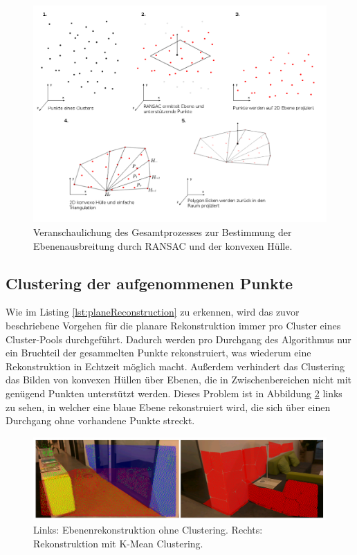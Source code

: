 \begin{figure}[h]
  \centering
	\includegraphics[width=1.1\textwidth]{content/images/methods/polygon-process.png} 
  \caption{Veranschaulichung des Gesamtprozesses zur Bestimmung der Ebenenausbreitung durch RANSAC und der konvexen Hülle.}
  \label{fig:polygon-process}
\end{figure}

\newpage

\subsection{Clustering der aufgenommenen Punkte} \label{sec:cluster}

Wie im Listing \ref{lst:planeReconstruction} zu erkennen, wird das zuvor beschriebene Vorgehen für die planare Rekonstruktion immer pro Cluster eines Cluster-Pools durchgeführt. Dadurch werden pro Durchgang des Algorithmus nur ein Bruchteil der gesammelten Punkte rekonstruiert, was wiederum eine Rekonstruktion in Echtzeit möglich macht. Außerdem verhindert das Clustering das Bilden von konvexen Hüllen über Ebenen, die in Zwischenbereichen nicht mit genügend Punkten unterstützt werden. Dieses Problem ist in Abbildung \ref{fig:clustering} links zu sehen, in welcher eine blaue Ebene rekonstruiert wird, die sich über einen Durchgang ohne vorhandene Punkte streckt.

\begin{figure}[h]
  \centering
	\includegraphics[width=1.0\textwidth]{content/images/methods/clustering.png} 
  \caption{Links: Ebenenrekonstruktion ohne Clustering. Rechts: Rekonstruktion mit K-Mean Clustering.}
  \label{fig:clustering}
\end{figure}

